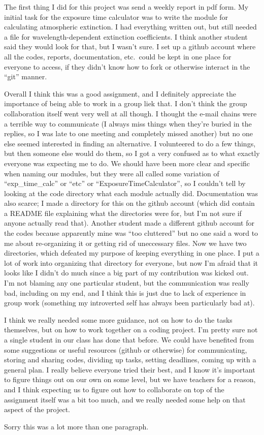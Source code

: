 \documentclass[12pt]{article}
\begin{document}
The first thing I did for this project was send a weekly report in pdf form.
My initial task for the exposure time calculator was to write the module
for calculating atmospheric extinction. I had everything written out, but still
needed a file for wavelength-dependent extinction coefficients. I think
another student said they would look for that, but I wasn't sure.
I set up a github account where all the codes, reports, documentation, etc.\
could be kept in one place for everyone to access, if they didn't know how
to fork or otherwise interact in the ``git'' manner.

Overall I think this was a good assignment, and I definitely appreciate the
importance of being able to work in a group liek that. I don't think the group
collaboration itself
went very well at all though. I thought the e-mail chains were a terrible way to
communicate (I always miss things when they're buried in the replies, so I
was late to one meeting and completely missed another)
but no one else seemed interested in finding an alternative.
I volunteered to do a few things, but then someone else would do them, so I
got a very confused as to what exactly everyone was expecting me to do.
We should have been more clear and specific when naming our modules, but
they were all called some variation of ``exp\_time\_calc''
or ``etc'' or ``ExposureTimeCalculator'', so I couldn't tell by looking at the
code directory what each module actually did. Documentation was also scarce;
I made a directory for this on the github account (which did contain a
README file explaining what the directories were for, but I'm not sure if
anyone actually read that).
Another student made a different github account for the codes because apparently
mine was ``too cluttered'' but no one said a word to me about re-organizing it
or getting rid of uneccessary files. Now we have two directories, which
defeated my purpose of keeping everything in one place.
I put a lot of work into organizing that directory for everyone, but
now I'm afraid that it looks like I didn't do much since a big part of
my contribution was kicked out. I'm not blaming any one particular student,
but the communication was really bad, including on my end, and I think
this is just due to lack of experience in group work (something my
introverted self has always been particularly bad at).

I think we really needed some more guidance, not on how to do the tasks themselves,
but on how to work together on a coding project.
I'm pretty sure not a single student in our class has
done that before. We could have benefited from some suggestions or useful
resources (github or otherwise) for communicating, storing and sharing codes,
dividing up tasks, setting deadlines, coming up with a general plan.
I really believe everyone tried their best, and I know it's important to figure
things out on our own on some level, but we have teachers for a reason, and
I think expecting us to figure out how to collaborate on top of the
assignment itself was a bit too much, and we really needed some help on that
aspect of the project.

Sorry this was a lot more than one paragraph.

\end{document}
